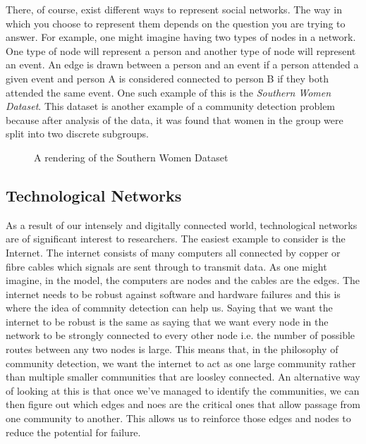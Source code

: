 There, of course, exist different ways to represent social networks. The way in which you choose to represent them depends on the question you are trying to answer. For example, one might imagine having two types of nodes in a network. One type of node will represent a person and another type of node will represent an event. An edge is drawn between a person and an event if a person attended a given event and person A is considered connected to person B if they both attended the same event. One such example of this is the \emph{Southern Women Dataset}.\cite{konect:southernwomen} This dataset is another example of a community detection problem because after analysis of the data, it was found that women in the group were split into two discrete subgroups.

\begin{figure}
    \begin{center}
    \end{center}
    \caption{A rendering of the Southern Women Dataset}
    \label{fig:southernwomen}
\end{figure}

\subsection{Technological Networks}\label{sec:Technological Networks}
As a result of our intensely and digitally connected world, technological networks are of significant interest to researchers. The easiest example to consider is the Internet. The internet consists of many computers all connected by copper or fibre cables which signals are sent through to transmit data. As one might imagine, in the model, the computers are nodes and the cables are the edges. The internet needs to be robust against software and hardware failures and this is where the idea of commnity detection can help us. Saying that we want the internet to be robust is the same as saying that we want every node in the network to be strongly connected to every other node i.e. the number of possible routes between any two nodes is large. This means that, in the philosophy of community detection, we want the internet to act as one large community rather than multiple smaller communities that are loosley connected. An alternative way of looking at this is that once we've managed to identify the communities, we can then figure out which edges and noes are the critical ones that allow passage from one community to another. This allows us to reinforce those edges and nodes to reduce the potential for failure.

